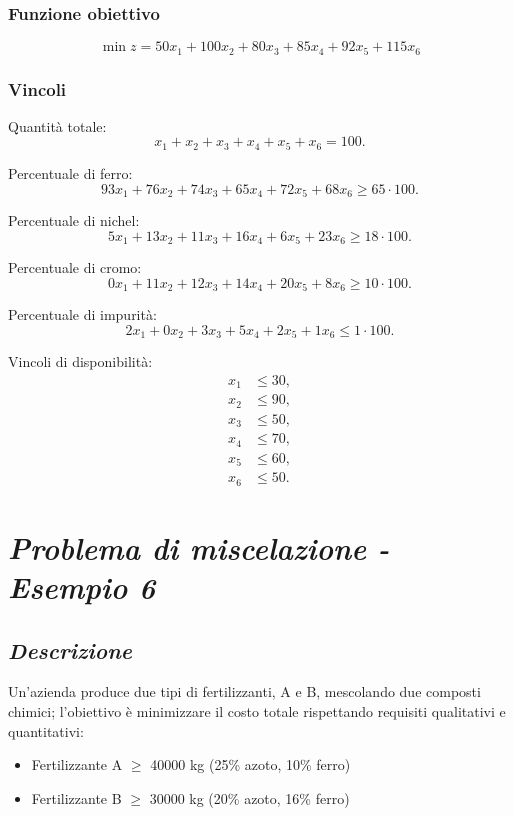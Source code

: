 \subsubsection{Funzione obiettivo}
\[ 
\min z = 50x_1 + 100x_2 + 80x_3 + 85x_4 + 92x_5 + 115x_6
\]

\subsubsection{Vincoli}
Quantità totale:
\[ 
x_1+x_2+x_3+x_4+x_5+x_6 = 100.
\]

Percentuale di ferro:
\[ 
93x_1+76x_2+74x_3+65x_4+72x_5+68x_6 \geq 65\cdot 100.
\]

Percentuale di nichel:
\[ 
5x_1+13x_2+11x_3+16x_4+6x_5+23x_6 \geq 18\cdot 100.
\]

Percentuale di cromo:
\[ 
0x_1+11x_2+12x_3+14x_4+20x_5+8x_6 \geq 10\cdot 100.
\]

Percentuale di impurità:
\[ 
2x_1+0x_2+3x_3+5x_4+2x_5+1x_6 \leq 1\cdot 100.
\]

Vincoli di disponibilità:
\[ 
\begin{aligned}
x_1 &\leq 30, \\
x_2 &\leq 90, \\
x_3 &\leq 50, \\
x_4 &\leq 70, \\
x_5 &\leq 60, \\
x_6 &\leq 50.
\end{aligned}
\]
 
\section{\textbf{\textit{Problema di miscelazione - Esempio 6}}}

\subsection{\textbf{\textit{Descrizione}}}
Un'azienda produce due tipi di fertilizzanti, A e B, mescolando due composti chimici; l'obiettivo è minimizzare il costo totale rispettando requisiti qualitativi e quantitativi:
\begin{itemize}
    \item Fertilizzante A $\geq$ 40000 kg (25\% azoto, 10\% ferro)
    \item Fertilizzante B $\geq$ 30000 kg (20\% azoto, 16\% ferro)
\end{itemize}

